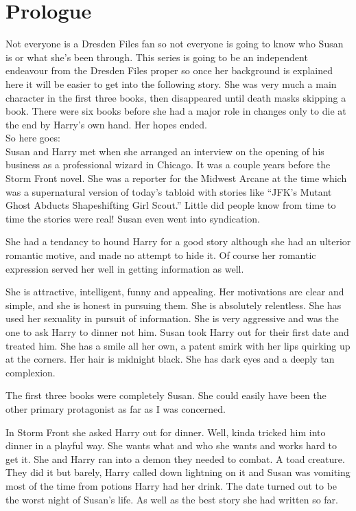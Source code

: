 \documentclass[12pt,twoside,onecolumn,openright,extrafontsizes]{memoir}
\begin{document}
\chapter*{Prologue}
{Not everyone is a Dresden Files fan so not everyone is going to know who Susan is or what she's been through. This series is going to be an independent endeavour from the Dresden Files proper so once her background is explained here it will be easier to get into the following story. She was very much a main character in the first three books, then disappeared until death masks skipping a book. There were six books before she had a major role in changes only to die at the end by Harry's own hand. Her hopes ended.\\

So here goes:\\

Susan and Harry met when she arranged an interview on the opening of his business as a professional wizard in Chicago. It was a couple years before the Storm Front novel. She was a reporter for the Midwest Arcane at the time which was a supernatural version of today's tabloid with stories like ``JFK’s Mutant Ghost Abducts Shapeshifting Girl Scout.'' Little did people know from time to time the stories were real! Susan even went into syndication.

She had a tendancy to hound Harry for a good story although she had an ulterior romantic motive, and made no attempt to hide it. Of course her romantic expression served her well in getting information as well.

She is attractive, intelligent, funny and appealing. Her motivations are clear and simple, and she is honest in pursuing them. She is absolutely relentless. She has used her sexuality in pursuit of information. She is very aggressive and was the one to ask Harry to dinner not him. Susan took Harry out for their first date and treated him. She has a smile all her own, a patent smirk with her lips quirking up at the corners. Her hair is midnight black. She has dark eyes and a deeply tan complexion.

The first three books were completely Susan. She could easily have been the other primary protagonist as far as I was concerned.

In Storm Front she asked Harry out for dinner. Well, kinda tricked him into dinner in a playful way. She wants what and who she wants and works hard to get it. She and Harry ran into a demon they needed to combat. A toad creature. They did it but barely, Harry called down lightning on it and Susan was vomiting most of the time from potions Harry had her drink. The date turned out to be the worst night of Susan's life. As well as the best story she had written so far.

}
\end{document}
